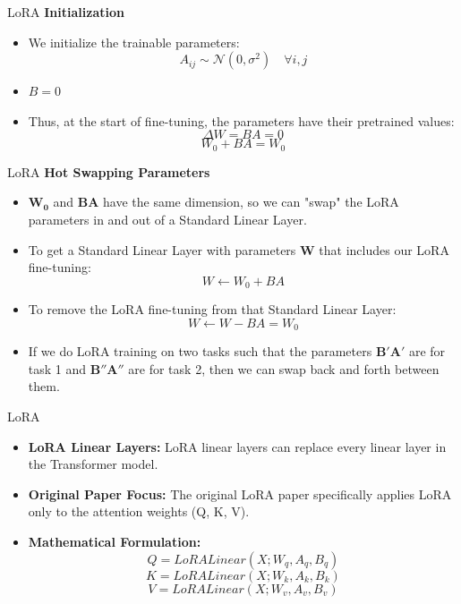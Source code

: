 \documentclass[serif, aspectratio=169]{beamer}
\begin{document}
\begin{frame}{LoRA}
    \textbf{Initialization}
    \begin{itemize}
        \item We initialize the trainable parameters:
        \[
        A_{ij} \sim \mathcal{N}(0, \sigma^2) \quad \forall i,j
        \]
        \item \( B = 0 \)
        \item Thus, at the start of fine-tuning, the parameters have their pretrained values:
        \[
        \Delta W = BA = 0
        \]
        \[
        W_0 + BA = W_0
        \]
    \end{itemize}
\end{frame}

\begin{frame}{LoRA}
    \textbf{Hot Swapping Parameters}
    \begin{itemize}
        \item \( \boldsymbol{W_0} \) and \( \boldsymbol{BA} \) have the same dimension, so we can "swap" the LoRA parameters in and out of a Standard Linear Layer.
        \item To get a Standard Linear Layer with parameters \( \boldsymbol{W} \) that includes our LoRA fine-tuning:
        \[
        W \leftarrow W_0 + BA
        \]
        \item To remove the LoRA fine-tuning from that Standard Linear Layer:
        \[
        W \leftarrow W - BA = W_0
        \]
        \item If we do LoRA training on two tasks such that the parameters \( \boldsymbol{B'A'} \) are for task 1 and \( \boldsymbol{B''A''} \) are for task 2, then we can swap back and forth between them.
    \end{itemize}
\end{frame}

\begin{frame}{LoRA}
    \begin{itemize}
        \item \textbf{LoRA Linear Layers:} LoRA linear layers can replace every linear layer in the Transformer model.
        \vspace{0.2cm}
        \item \textbf{Original Paper Focus:} The original LoRA paper specifically applies LoRA only to the attention weights (Q, K, V).
        \vspace{0.2cm}
        \item \textbf{Mathematical Formulation:} 
        \vspace{0.3cm}
        \[
        Q = LoRALinear(X; W_q, A_q, B_q)
        \]
        \[
        K = LoRALinear(X; W_k, A_k, B_k)
        \]
        \[
        V = LoRALinear(X; W_v, A_v, B_v)
        \]
    \end{itemize}
\end{frame}
\end{document}
